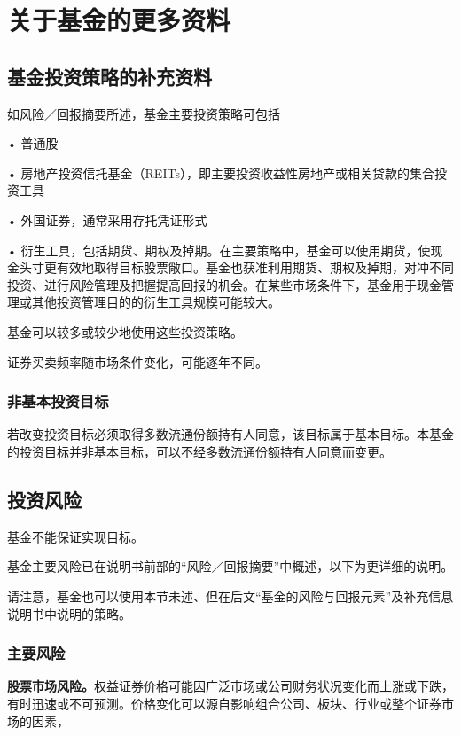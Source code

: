 \documentclass[UTF8,fontset=none,11pt,a4paper]{ctexart}
\begin{document}
\par{}\label{originalpage4}
\section*{关于基金的更多资料}\label{unitU240}
\subsection*{基金投资策略的补充资料}\label{unitU241}
如风险／回报摘要所述，基金主要投资策\allowbreak\mbox{略可包括}

\noindent • 普通股\par\smallskip
\noindent • 房地产投资信托基金（REITs），即主要投资收益性房地产或相关贷款的集合\allowbreak\mbox{投资工具}\par\smallskip
\noindent • 外国证券，通常采用存托\allowbreak\mbox{凭证形式}\par\smallskip
\noindent • 衍生工具，包括期货、期权及掉期。在主要策略中，基金可以使用期货，使现金头寸更有效地取得目标股票敞口。基金也获准利用期货、期权及掉期，对冲不同投资、进行风险管理及把握提高回报的机会。在某些市场条件下，基金用于现金管理或其他投资管理目的的衍生工具规模\allowbreak\mbox{可能较大。}\par\smallskip
基金可以较多或较少地使用这些\allowbreak\mbox{投资策略。}

证券买卖频率随市场条件变化，可能\allowbreak\mbox{逐年不同。}

\subsubsection*{非基本投资目标}
若改变投资目标必须取得多数流通份额持有人同意，该目标属于基本目标。本基金的投资目标并非基本目标，可以不经多数流通份额持有人同\allowbreak\mbox{意而变更。}


\subsection*{投资风险}\label{unitU255}
基金不能保证\allowbreak\mbox{实现目标。}

基金主要风险已在说明书前部的“风险／回报摘要”中概述，以下为更详\allowbreak\mbox{细的说明。}

请注意，基金也可以使用本节未述、但在后文“基金的风险与回报元素”及补充信息说明书中说\allowbreak\mbox{明的策略。}

\subsubsection*{主要风险}
\textbf{股票市场风险。}权益证券价格可能因广泛市场或公司财务状况变化而上涨或下跌，有时迅速或不可预测。价格变化可以源自影响组合公司、板块、行业或整个证券市\allowbreak\mbox{场的因素，}
\end{document}
